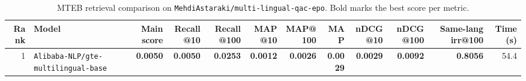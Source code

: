 \begin{table}[t]
\centering
\small
\begin{tabular}{r l r r r r r r r r r r}
\hline
Rank & Model & Main score & Recall@10 & Recall@100 & MAP@10 & MAP@100 & MAP & nDCG@10 & nDCG@100 & Same-lang irr@100 & Time (s) \\
\hline
1 & \texttt{Alibaba-NLP/gte-multilingual-base} & \textbf{0.0050} & \textbf{0.0050} & \textbf{0.0253} & \textbf{0.0012} & \textbf{0.0026} & \textbf{0.0029} & \textbf{0.0029} & \textbf{0.0092} & \textbf{0.8056} & 54.4 \\
\hline
\end{tabular}
\caption{MTEB retrieval comparison on \texttt{MehdiAstaraki/multi-lingual-qac-epo}. Bold marks the best score per metric.}
\label{tab:mteb-model-comparison}
\end{table}
